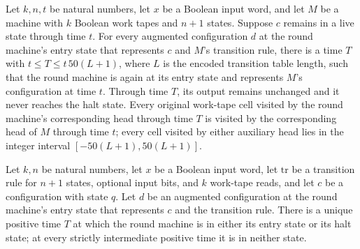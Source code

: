 \begin{theorem}
\label{Turing.StepBlock.roundTM_iterate}
\leanok
{}
Let $k,n,t$ be natural numbers, let $x$ be a Boolean input word, and let $M$ be a
machine with $k$ Boolean work tapes and $n+1$ states. Suppose $c$ remains in a live
state through time $t$. For every augmented configuration $d$ at the round machine's
entry state that represents $c$ and $M$'s transition rule, there is a time $T$ with
$t\le T\le t\,50(L+1)$, where $L$ is the encoded transition table length, such that the
round machine is again at its entry state and represents $M$'s configuration at time
$t$. Through time $T$, its output remains unchanged and it never reaches the halt state.
Every original work-tape cell visited by the round machine's corresponding head through
time $T$ is visited by the corresponding head of $M$ through time $t$; every cell
visited by either auxiliary head lies in the integer interval $[-50(L+1),50(L+1)]$.
\end{theorem}

\begin{theorem}
\label{Turing.StepBlock.roundTM_firstExit_unique}
\leanok
{}
Let $k,n$ be natural numbers, let $x$ be a Boolean input word, let $\mathrm{tr}$ be a
transition rule for $n+1$ states, optional input bits, and $k$ work-tape reads, and let
$c$ be a configuration with state $q$. Let $d$ be an augmented configuration at the
round machine's entry state that represents $c$ and the transition rule. There is a
unique positive time $T$ at which the round machine is in either its entry state or its
halt state; at every strictly intermediate positive time it is in neither state.
\end{theorem}
